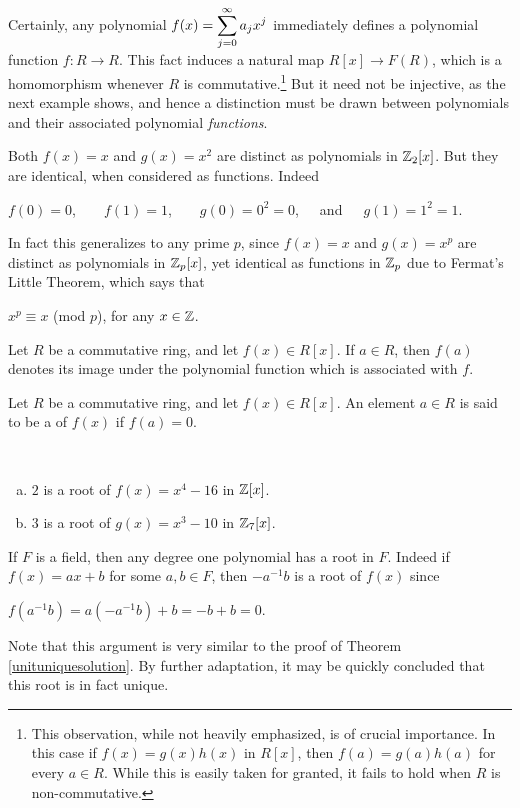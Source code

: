\documentclass[11pt,fleqn,dvipsnames,usenames]{article}
\newcommand{\p}{\noindent}
\begin{document}
\p Certainly, any polynomial $f(x) = \displaystyle\sum\limits_{j=0}^{\infty}a_{j}x^{j}$ immediately defines a polynomial function $f:R\to R$.  This fact induces a natural map $R[x]\to F(R)$, which is a homomorphism whenever $R$ is commutative.\footnote{This observation, while not heavily emphasized, is of crucial importance.  In this case if $f(x) = g(x)h(x)$ in $R[x]$, then $f(a) = g(a)h(a)$ for every $a\in R$.  While this is easily taken for granted, it fails to hold when $R$ is non-commutative.}  But it need not be injective, as the next example shows, and hence a distinction must be drawn between polynomials and their associated polynomial \emph{functions}.
\vsp

\begin{example}
Both $f(x) = x$ and $g(x) = x^2$ are distinct as polynomials in $\mathbb{Z}_2[x]$.  But they are identical, when considered as functions.  Indeed
\begin{center}
$f(0) = 0$,\ \ \ \ $f(1) = 1$,\ \ \ \ $g(0) = 0^2 = 0$,\ \ \ and\ \ \ $g(1) = 1^2 = 1$.
\end{center}
\p In fact this generalizes to any prime $p$, since $f(x) = x$ and $g(x) = x^{p}$ are distinct as polynomials in $\mathbb{Z}_p[x]$, yet identical as functions in $\mathbb{Z}_p$ due to Fermat's Little Theorem, which says that
\begin{center}
$x^{p}\equiv x$ (mod $p$), for any $x\in\mathbb{Z}$.
\end{center}
\end{example}
%

\notation Let $R$ be a commutative ring, and let $f(x)\in R[x]$.  If $a\in R$, then $f(a)$ denotes its image under the polynomial function which is associated with $f$.
\vsp

\begin{definition}
Let $R$ be a commutative ring, and let $f(x)\in R[x]$.  An element $a\in R$ is said to be a  of $f(x)$ if $f(a) = 0$.
\end{definition}
\vsp

%
\begin{examples}~
\begin{enumerate}[(a)]
\item $2$ is a root of $f(x) = x^4 - 16$ in $\mathbb{Z}[x]$.
\item $3$ is a root of $g(x) = x^3 - 10$ in $\mathbb{Z}_7[x]$.
\end{enumerate}
\end{examples}
\vsp

%
\begin{example}\label{degreeoneuniqueroot}
If $F$ is a field, then any degree one polynomial has a root in $F$.  Indeed if $f(x) = ax + b$ for some $a,b\in F$, then $-a^{-1}b$ is a root of $f(x)$ since
\begin{center}
$f(a^{-1}b) = a(-a^{-1}b) + b = -b + b = 0$.
\end{center}
\p Note that this argument is very similar to the proof of Theorem \ref{unituniquesolution}.  By further adaptation, it may be quickly concluded that this root is in fact unique.
\end{example}
\vsp
\end{document}
